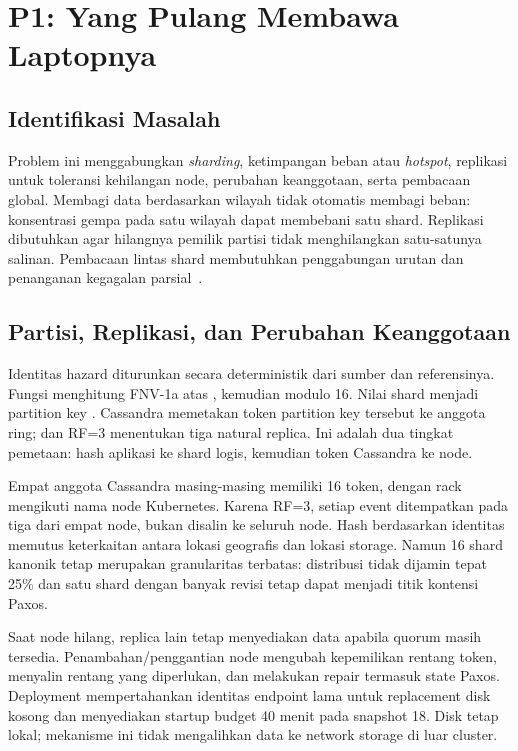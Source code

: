 \chapter{P1: Yang Pulang Membawa Laptopnya}
\section{Identifikasi Masalah}
Problem ini menggabungkan \emph{sharding}, ketimpangan beban atau \emph{hotspot}, replikasi untuk toleransi kehilangan node, perubahan keanggotaan, serta pembacaan global. Membagi data berdasarkan wilayah tidak otomatis membagi beban: konsentrasi gempa pada satu wilayah dapat membebani satu shard. Replikasi dibutuhkan agar hilangnya pemilik partisi tidak menghilangkan satu-satunya salinan. Pembacaan lintas shard membutuhkan penggabungan urutan dan penanganan kegagalan parsial~\cite{cassandra}.

\section{Partisi, Replikasi, dan Perubahan Keanggotaan}
Identitas hazard diturunkan secara deterministik dari sumber dan referensinya. Fungsi  menghitung FNV-1a atas , kemudian modulo 16. Nilai shard menjadi partition key . Cassandra memetakan token partition key tersebut ke anggota ring;  dan RF=3 menentukan tiga natural replica. Ini adalah dua tingkat pemetaan: hash aplikasi ke shard logis, kemudian token Cassandra ke node.

Empat anggota Cassandra masing-masing memiliki 16 token, dengan rack mengikuti nama node Kubernetes. Karena RF=3, setiap event ditempatkan pada tiga dari empat node, bukan disalin ke seluruh node. Hash berdasarkan identitas memutus keterkaitan antara lokasi geografis dan lokasi storage. Namun 16 shard kanonik tetap merupakan granularitas terbatas: distribusi tidak dijamin tepat 25\% dan satu shard dengan banyak revisi tetap dapat menjadi titik kontensi Paxos.

Saat node hilang, replica lain tetap menyediakan data apabila quorum masih tersedia. Penambahan/penggantian node mengubah kepemilikan rentang token, menyalin rentang yang diperlukan, dan melakukan repair termasuk state Paxos. Deployment mempertahankan identitas endpoint lama untuk replacement disk kosong dan menyediakan startup budget 40 menit pada snapshot 18. Disk tetap lokal; mekanisme ini tidak mengalihkan data ke network storage di luar cluster.

